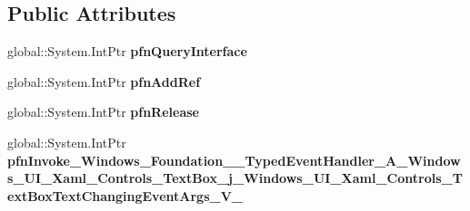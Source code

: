 \subsection*{Public Attributes}
\begin{DoxyCompactItemize}
\item 
\mbox{\label{struct_windows_1_1_foundation_1_1_typed_event_handler___a___windows___u_i___xaml___controls___tef88d8535df07672acd9dfc6e3861f1e1_aab839a6c84373682c5f5faccc83b4695}} 
global\+::\+System.\+Int\+Ptr {\bfseries pfn\+Query\+Interface}
\item 
\mbox{\label{struct_windows_1_1_foundation_1_1_typed_event_handler___a___windows___u_i___xaml___controls___tef88d8535df07672acd9dfc6e3861f1e1_a9068680e22533ec6f27739c5aaa6a584}} 
global\+::\+System.\+Int\+Ptr {\bfseries pfn\+Add\+Ref}
\item 
\mbox{\label{struct_windows_1_1_foundation_1_1_typed_event_handler___a___windows___u_i___xaml___controls___tef88d8535df07672acd9dfc6e3861f1e1_a2d1504c0dfb3cfcc4035bbfce4a65764}} 
global\+::\+System.\+Int\+Ptr {\bfseries pfn\+Release}
\item 
\mbox{\label{struct_windows_1_1_foundation_1_1_typed_event_handler___a___windows___u_i___xaml___controls___tef88d8535df07672acd9dfc6e3861f1e1_a052ec353d5feab652c1491f761172605}} 
global\+::\+System.\+Int\+Ptr {\bfseries pfn\+Invoke\+\_\+\+Windows\+\_\+\+Foundation\+\_\+\+\_\+\+Typed\+Event\+Handler\+\_\+\+A\+\_\+\+Windows\+\_\+\+U\+I\+\_\+\+Xaml\+\_\+\+Controls\+\_\+\+Text\+Box\+\_\+j\+\_\+\+Windows\+\_\+\+U\+I\+\_\+\+Xaml\+\_\+\+Controls\+\_\+\+Text\+Box\+Text\+Changing\+Event\+Args\+\_\+\+V\+\_\+}
\end{DoxyCompactItemize}
